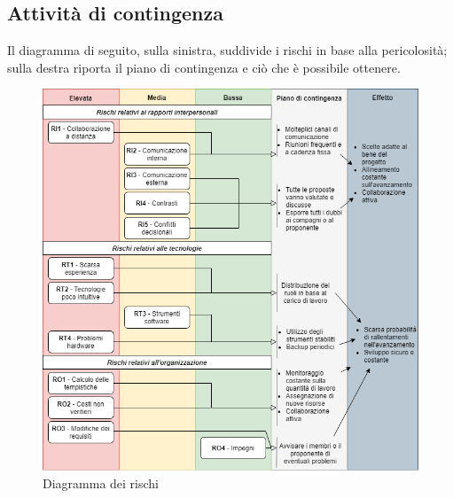 \subsection{Attività di contingenza}

Il diagramma di seguito, sulla sinistra, suddivide i rischi in base alla pericolosità; sulla destra riporta il piano di contingenza e ciò che è possibile ottenere. 

\begin{figure}[!htb]
\includegraphics[width=17.5cm]{Images/rischi}
\caption{Diagramma dei rischi}
\end{figure}


